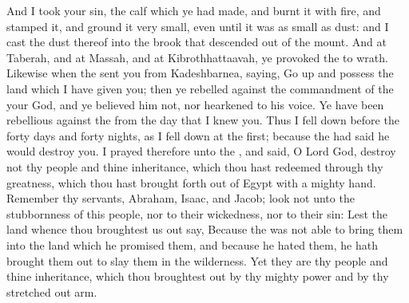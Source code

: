 \begin{biblechapter}
\verse And I took your sin, the calf which ye had made, and burnt it with fire, and stamped it, and ground it very small, even until it was as small as dust: and I cast the dust thereof into the brook that descended out of the mount.
\verse And at Taberah, and at Massah, and at Kibrothhattaavah, ye provoked the \LORD to wrath.
\verse Likewise when the \LORD sent you from Kadeshbarnea, saying, Go up and possess the land which I have given you; then ye rebelled against the commandment of the \LORD your God, and ye believed him not, nor hearkened to his voice.
\verse Ye have been rebellious against the \LORD from the day that I knew you.
\verse Thus I fell down before the \LORD forty days and forty nights, as I fell down at the first; because the \LORD had said he would destroy you.
\verse I prayed therefore unto the \LORD, and said, O Lord God, destroy not thy people and thine inheritance, which thou hast redeemed through thy greatness, which thou hast brought forth out of Egypt with a mighty hand.
\verse Remember thy servants, Abraham, Isaac, and Jacob; look not unto the stubbornness of this people, nor to their wickedness, nor to their sin:
\verse Lest the land whence thou broughtest us out say, Because the \LORD was not able to bring them into the land which he promised them, and because he hated them, he hath brought them out to slay them in the wilderness.
\verse Yet they are thy people and thine inheritance, which thou broughtest out by thy mighty power and by thy stretched out arm.
\end{biblechapter}

